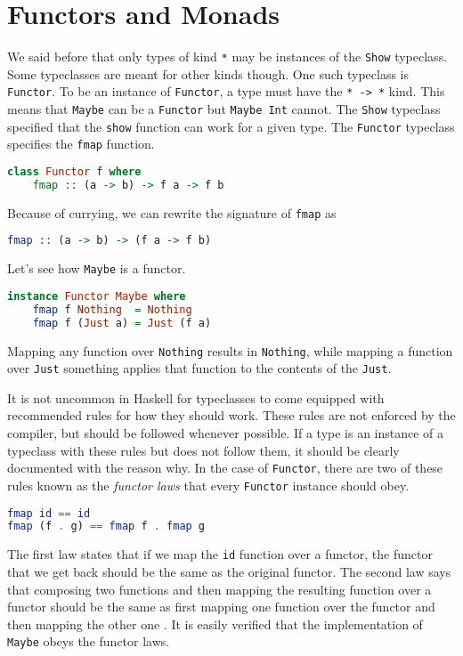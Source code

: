 \documentclass[MS, xcolor=dvipsnames]{wfuthesis}
\theoremstyle{definition}
\begin{document}
\section{Functors and Monads}
We said before that only types of kind \lstinline{*} may be instances of the \lstinline{Show} typeclass. Some typeclasses are meant for other kinds though. One such typeclass is \lstinline{Functor}. To be an instance of \lstinline{Functor}, a type must have the \lstinline{* -> *} kind. This means that \lstinline{Maybe} can be a \lstinline{Functor} but \lstinline{Maybe Int} cannot. The \lstinline{Show} typeclass specified that the \lstinline{show} function can work for a given type. The \lstinline{Functor} typeclass specifies the \lstinline{fmap} function. 
\begin{lstlisting}[language=Haskell]
class Functor f where
    fmap :: (a -> b) -> f a -> f b
\end{lstlisting}
Because of currying, we can rewrite the signature of \lstinline{fmap} as 
\begin{lstlisting}[language=Haskell]
fmap :: (a -> b) -> (f a -> f b)
\end{lstlisting}
Let's see how \lstinline{Maybe} is a functor.
\begin{lstlisting}[language=Haskell]
instance Functor Maybe where
    fmap f Nothing  = Nothing
    fmap f (Just a) = Just (f a)
\end{lstlisting}
Mapping any function over \lstinline{Nothing} results in \lstinline{Nothing}, while mapping a function over \lstinline{Just} something applies that function to the contents of the \lstinline{Just}. \par 
It is not uncommon in Haskell for typeclasses to come equipped with recommended rules for how they should work. These rules are not enforced by the compiler, but should be followed whenever possible. If a type is an instance of a typeclass with these rules but does not follow them, it should be clearly documented with the reason why. In the case of \lstinline{Functor}, there are two of these rules known as the \emph{functor laws} that every \lstinline{Functor} instance should obey. 
\begin{lstlisting}[language=Haskell]
fmap id == id
fmap (f . g) == fmap f . fmap g
\end{lstlisting}
The first law states that if we map the \lstinline{id} function over a functor, the functor that we get back should be the same as the original functor. The second law says that composing two functions and then mapping the resulting function over a functor should be the same as first mapping one function over the functor and then mapping the other one \cite{Lipovaca2011}. It is easily verified that the implementation of \lstinline{Maybe} obeys the functor laws. \par 
\end{document}
